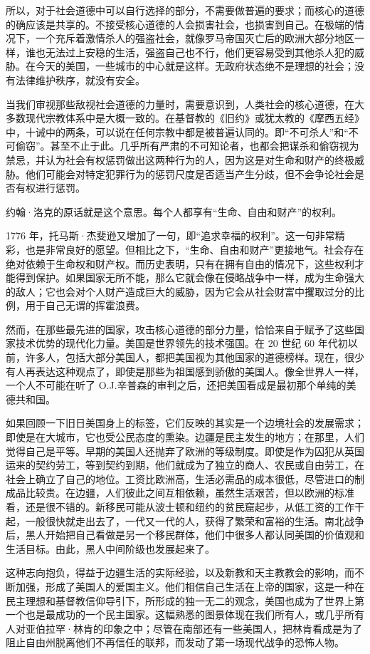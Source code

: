 所以，对于社会道德中可以自行选择的部分，不需要做普遍的要求；而核心的道德的确应该是共享的。不接受核心道德的人会损害社会，也损害到自己。在极端的情况下，一个充斥着激情杀人的强盗社会，就像罗马帝国灭亡后的欧洲大部分地区一样，谁也无法过上安稳的生活，强盗自己也不行，他们更容易受到其他杀人犯的威胁。在今天的美国，一些城市的中心就是这样。无政府状态绝不是理想的社会；没有法律维护秩序，就没有安全。

当我们审视那些敌视社会道德的力量时，需要意识到，人类社会的核心道德，在大多数现代宗教体系中是大概一致的。在基督教的《旧约》或犹太教的《摩西五经》中，十诫中的两条，可以说在任何宗教中都是被普遍认同的。即“不可杀人”和“不可偷窃”。甚至不止于此。几乎所有严肃的不可知论者，也都会把谋杀和偷窃视为禁忌，并认为社会有权惩罚做出这两种行为的人，因为这是对生命和财产的终极威胁。他们可能会对特定犯罪行为的惩罚尺度是否适当产生分歧，但不会争论社会是否有权进行惩罚。

约翰·洛克的原话就是这个意思。每个人都享有“生命、自由和财产”的权利。

1776 年，托马斯·杰斐逊又增加了一句，即“追求幸福的权利”。这一句非常精彩，也是非常良好的愿望。但相比之下，“生命、自由和财产”更接地气。社会存在绝对依赖于生命权和财产权。而历史表明，只有在拥有自由的情况下，这些权利才能得到保护。如果国家无所不能，那么它就会像在侵略战争中一样，成为生命强大的敌人；它也会对个人财产造成巨大的威胁，因为它会从社会财富中攫取过分的比例，用于自己无谓的挥霍浪费。

然而，在那些最先进的国家，攻击核心道德的部分力量，恰恰来自于赋予了这些国家技术优势的现代化力量。美国是世界领先的技术强国。在 20 世纪 60 年代初以前，许多人，包括大部分美国人，都把美国视为其他国家的道德榜样。现在，很少有人再表达这种观点了，即使是那些为祖国感到骄傲的美国人。像全世界人一样，一个人不可能在听了 O.J.辛普森的审判之后，还把美国看成是最初那个单纯的美德共和国。

如果回顾一下旧日美国身上的标签，它们反映的其实是一个边境社会的发展需求；即使是在大城市，它也受公民态度的熏染。边疆是民主发生的地方；在那里，人们觉得自己是平等。早期的美国人还抛弃了欧洲的等级制度。即使是作为囚犯从英国运来的契约劳工，等到契约到期，他们就成为了独立的商人、农民或自由劳工，在社会上确立了自己的地位。工资比欧洲高，生活必需品的成本很低，尽管进口的制成品比较贵。在边疆，人们彼此之间互相依赖，虽然生活艰苦，但以欧洲的标准看，还是很不错的。新移民可能从波士顿和纽约的贫民窟起步，从低工资的工作干起，一般很快就走出去了，一代又一代的人，获得了繁荣和富裕的生活。南北战争后，黑人开始把自己看做是另一个移民群体，他们中很多人都认同美国的价值观和生活目标。由此，黑人中间阶级也发展起来了。

这种志向抱负，得益于边疆生活的实际经验，以及新教和天主教教会的影响，而不断加强，形成了美国人的爱国主义。他们相信自己生活在上帝的国家，这是一种在民主理想和基督教信仰导引下，所形成的独一无二的观念，美国也成为了世界上第一个也是最成功的一个民主国家。这幅熟悉的图景体现在我们所有人，或几乎所有人对亚伯拉罕·林肯的印象之中；尽管在南部还有一些美国人，把林肯看成是为了阻止自由州脱离他们不再信任的联邦，而发动了第一场现代战争的恐怖人物。

